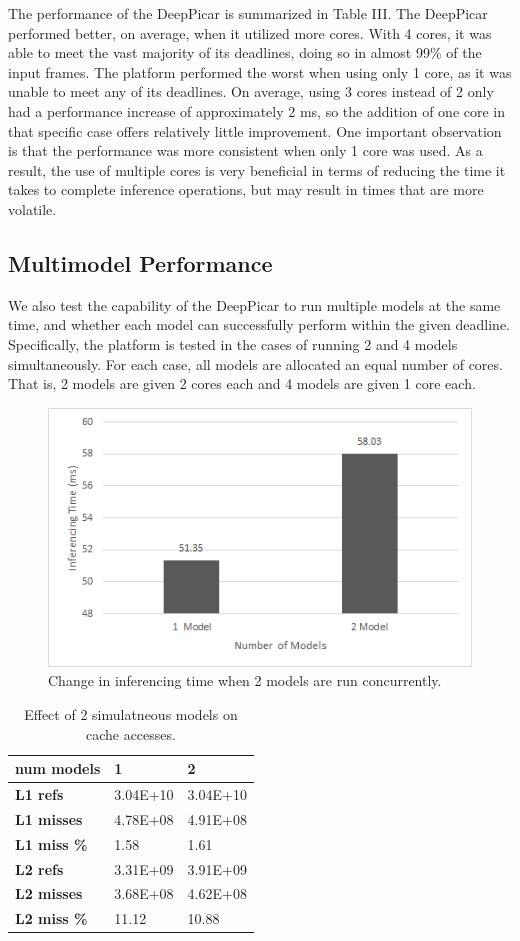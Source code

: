 The performance of the DeepPicar is summarized in Table III. The DeepPicar performed better, on average, 
when it utilized more cores. With 4 cores, it was able to meet the vast majority of its deadlines, doing 
so in almost 99\% of the input frames. The platform performed the worst when using only 1 core, 
as it was unable to meet any of its deadlines.  On average, using 3 cores instead of 2 only had a 
performance increase of approximately 2 ms, so the addition of one core in that specific case offers 
relatively little improvement. One important observation is that the performance was more consistent 
when only 1 core was used. As a result, the use of multiple cores is very beneficial in terms of 
reducing the time it takes to complete inference operations, but may result in times that are more 
volatile.

\subsection{Multimodel Performance}
We also test the capability of the DeepPicar to run multiple models at the same time, and whether each 
model can successfully perform within the given deadline. Specifically, the platform is tested in the 
cases of running 2 and 4 models simultaneously. For each case, all models are allocated an equal number 
of cores. That is, 2 models are given 2 cores each and 4 models are given 1 core each.

\begin{figure}[h]
  \centering
  \includegraphics[width=.5\textwidth]{figs/2ModelChart}
  \caption{ Change in inferencing time when 2 models are run concurrently. }
\end{figure}

\begin{table}[h]
\centering
  \begin{tabular} {| l | l | l |}
  \hline
  \textbf{num models} & 1 & 2 \\ \hline
  \textbf{L1 refs} &  3.04E+10 &  3.04E+10 \\ \hline
  \textbf{L1 misses} & 4.78E+08 & 4.91E+08 \\ \hline
  \textbf{L1 miss \%} & 1.58 & 1.61 \\ \hline
  \textbf{L2 refs} & 3.31E+09 &  3.91E+09 \\ \hline
  \textbf{L2 misses} & 3.68E+08 & 4.62E+08 \\ \hline
  \textbf{L2 miss \%} & 11.12 & 10.88 \\ \hline
  \end{tabular}
  \caption{ Effect of 2 simulatneous models on cache accesses. }
\end{table}

